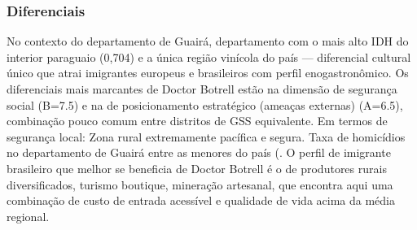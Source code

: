 \subsubsection*{Diferenciais}\label{dif-doctor-botrell-0403}
No contexto do departamento de Guairá, departamento com o mais alto IDH do interior paraguaio (0,704) e a única região vinícola do país — diferencial cultural único que atrai imigrantes europeus e brasileiros com perfil enogastronômico. Os diferenciais mais marcantes de Doctor Botrell estão na dimensão de segurança social (B=7.5) e na de posicionamento estratégico (ameaças externas) (A=6.5), combinação pouco comum entre distritos de GSS equivalente. Em termos de segurança local: Zona rural extremamente pacífica e segura. Taxa de homicídios no departamento de Guairá entre as menores do país (. O perfil de imigrante brasileiro que melhor se beneficia de Doctor Botrell é o de produtores rurais diversificados, turismo boutique, mineração artesanal, que encontra aqui uma combinação de custo de entrada acessível e qualidade de vida acima da média regional.
